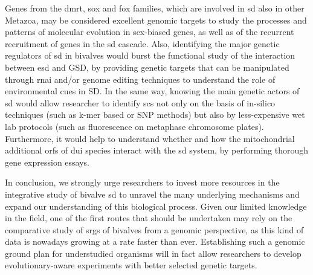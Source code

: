 Genes from the \gls{dmrt}, \gls{sox} and \gls{fox} families, which are involved in \gls{sd} also in other Metazoa, may be considered excellent genomic targets to study the processes and patterns of molecular evolution in sex-biased genes, as well as of the recurrent recruitment of genes in the \gls{sd} cascade. Also, identifying the major genetic regulators of \gls{sd} in bivalves would burst the functional study of the interaction between \gls{esd} and GSD, by providing genetic targets that can be manipulated through \gls{rnai} and/or genome editing techniques to understand the role of environmental cues in SD. In the same way, knowing the main genetic actors of \gls{sd} would allow researcher to identify \glspl{sc} not only on the basis of in-silico techniques (such as k-mer based or SNP methods) but also by less-expensive wet lab protocols (such as fluorescence  on metaphase chromosome plates). Furthermore, it would help to understand whether and how the mitochondrial additional \glspl{orf} of \gls{dui} species interact with the \gls{sd} system, by performing thorough gene expression essays.

In conclusion, we strongly urge researchers to invest more resources in the integrative study of bivalve \gls{sd} to unravel the many underlying mechanisms and expand our understanding of this biological process. Given our limited knowledge in the field, one of the first routes that should be undertaken may rely on the comparative study of \glspl{srg} of bivalves from a genomic perspective, as this kind of data is nowadays growing at a rate faster than ever. Establishing such a genomic ground plan for understudied organisms will in fact allow researchers to develop evolutionary-aware experiments with better selected genetic targets.

